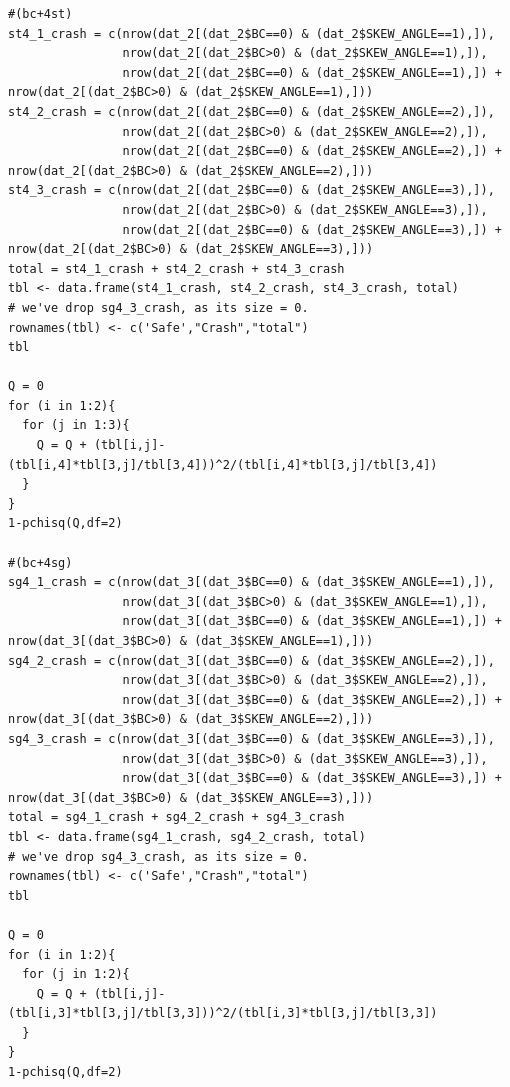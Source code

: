 \documentclass[11pt]{scrartcl} %
\begin{document}
\begin{lstlisting}
#(bc+4st)
st4_1_crash = c(nrow(dat_2[(dat_2$BC==0) & (dat_2$SKEW_ANGLE==1),]),
                nrow(dat_2[(dat_2$BC>0) & (dat_2$SKEW_ANGLE==1),]),
                nrow(dat_2[(dat_2$BC==0) & (dat_2$SKEW_ANGLE==1),]) + nrow(dat_2[(dat_2$BC>0) & (dat_2$SKEW_ANGLE==1),]))
st4_2_crash = c(nrow(dat_2[(dat_2$BC==0) & (dat_2$SKEW_ANGLE==2),]),
                nrow(dat_2[(dat_2$BC>0) & (dat_2$SKEW_ANGLE==2),]),
                nrow(dat_2[(dat_2$BC==0) & (dat_2$SKEW_ANGLE==2),]) + nrow(dat_2[(dat_2$BC>0) & (dat_2$SKEW_ANGLE==2),]))
st4_3_crash = c(nrow(dat_2[(dat_2$BC==0) & (dat_2$SKEW_ANGLE==3),]),
                nrow(dat_2[(dat_2$BC>0) & (dat_2$SKEW_ANGLE==3),]),
                nrow(dat_2[(dat_2$BC==0) & (dat_2$SKEW_ANGLE==3),]) + nrow(dat_2[(dat_2$BC>0) & (dat_2$SKEW_ANGLE==3),]))
total = st4_1_crash + st4_2_crash + st4_3_crash
tbl <- data.frame(st4_1_crash, st4_2_crash, st4_3_crash, total)
# we've drop sg4_3_crash, as its size = 0.
rownames(tbl) <- c('Safe',"Crash","total")
tbl

Q = 0
for (i in 1:2){
  for (j in 1:3){
    Q = Q + (tbl[i,j]-(tbl[i,4]*tbl[3,j]/tbl[3,4]))^2/(tbl[i,4]*tbl[3,j]/tbl[3,4])
  }
}
1-pchisq(Q,df=2)

#(bc+4sg)
sg4_1_crash = c(nrow(dat_3[(dat_3$BC==0) & (dat_3$SKEW_ANGLE==1),]),
                nrow(dat_3[(dat_3$BC>0) & (dat_3$SKEW_ANGLE==1),]),
                nrow(dat_3[(dat_3$BC==0) & (dat_3$SKEW_ANGLE==1),]) + nrow(dat_3[(dat_3$BC>0) & (dat_3$SKEW_ANGLE==1),]))
sg4_2_crash = c(nrow(dat_3[(dat_3$BC==0) & (dat_3$SKEW_ANGLE==2),]),
                nrow(dat_3[(dat_3$BC>0) & (dat_3$SKEW_ANGLE==2),]),
                nrow(dat_3[(dat_3$BC==0) & (dat_3$SKEW_ANGLE==2),]) + nrow(dat_3[(dat_3$BC>0) & (dat_3$SKEW_ANGLE==2),]))
sg4_3_crash = c(nrow(dat_3[(dat_3$BC==0) & (dat_3$SKEW_ANGLE==3),]),
                nrow(dat_3[(dat_3$BC>0) & (dat_3$SKEW_ANGLE==3),]),
                nrow(dat_3[(dat_3$BC==0) & (dat_3$SKEW_ANGLE==3),]) + nrow(dat_3[(dat_3$BC>0) & (dat_3$SKEW_ANGLE==3),]))
total = sg4_1_crash + sg4_2_crash + sg4_3_crash
tbl <- data.frame(sg4_1_crash, sg4_2_crash, total)
# we've drop sg4_3_crash, as its size = 0.
rownames(tbl) <- c('Safe',"Crash","total")
tbl

Q = 0
for (i in 1:2){
  for (j in 1:2){
    Q = Q + (tbl[i,j]-(tbl[i,3]*tbl[3,j]/tbl[3,3]))^2/(tbl[i,3]*tbl[3,j]/tbl[3,3])
  }
}
1-pchisq(Q,df=2)


\end{lstlisting}
\end{document}
